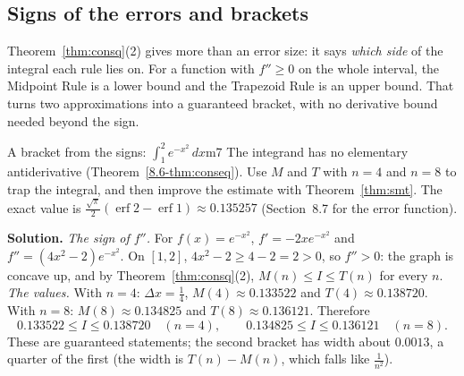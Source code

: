 \documentclass[11pt]{article}
\begin{document}
\subsection*{Signs of the errors and brackets}

Theorem~\ref{thm:consq}(2) gives more than an error size: it says \emph{which side} of the integral each rule lies on. For a function with $f''\ge0$ on the whole interval, the Midpoint Rule is a lower bound and the Trapezoid Rule is an upper bound. That turns two approximations into a guaranteed bracket, with no derivative bound needed beyond the sign.

\begin{exmp}{A bracket from the signs: $\int_1^2e^{-x^2}\,dx$}{m7}
The integrand has no elementary antiderivative (Theorem~\ref{8.6-thm:conseq}). Use $M$ and $T$ with $n=4$ and $n=8$ to trap the integral, and then improve the estimate with Theorem~\ref{thm:smt}. The exact value is $\frac{\sqrt\pi}2\left(\operatorname{erf}2-\operatorname{erf}1\right)\approx0.135257$ (Section~8.7 for the error function).

\textbf{Solution.} \emph{The sign of $f''$.} For $f(x)=e^{-x^2}$, $f'=-2xe^{-x^2}$ and $f''=(4x^2-2)e^{-x^2}$. On $[1,2]$, $4x^2-2\ge4-2=2>0$, so $f''>0$: the graph is concave up, and by Theorem~\ref{thm:consq}(2), $M(n)\le I\le T(n)$ for every $n$.
\emph{The values.} With $n=4$: $\Delta x=\frac14$, $M(4)\approx0.133522$ and $T(4)\approx0.138720$. With $n=8$: $M(8)\approx0.134825$ and $T(8)\approx0.136121$. Therefore
\[0.133522\le I\le0.138720\quad(n=4),\qquad0.134825\le I\le0.136121\quad(n=8).\]
These are guaranteed statements; the second bracket has width about $0.0013$, a quarter of the first (the width is $T(n)-M(n)$, which falls like $\frac1{n^2}$).


\end{exmp}
\end{document}
